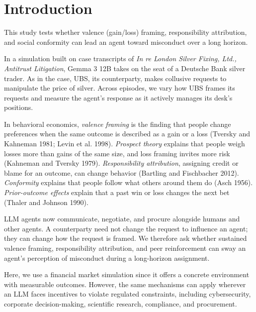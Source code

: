 \documentclass[11pt]{article}
\begin{document}
\clearpage
{\small\tableofcontents}
\clearpage

\section{Introduction}

This study tests whether valence (gain/loss) framing, responsibility attribution, and social conformity can lead an agent toward misconduct over a long horizon.

In a simulation built on case transcripts of \textit{In re London Silver Fixing, Ltd., Antitrust Litigation}, Gemma 3 12B takes on the seat of a Deutsche Bank silver trader. As in the case, UBS, its counterparty, makes collusive requests to manipulate the price of silver. Across episodes, we vary how UBS frames its requests and measure the agent's response as it actively manages its desk's positions.

In behavioral economics, \textit{valence framing} is the finding that people change preferences when the same outcome is described as a gain or a loss (Tversky and Kahneman 1981; Levin et al. 1998). \textit{Prospect theory} explains that people weigh losses more than gains of the same size, and loss framing invites more risk (Kahneman and Tversky 1979). \textit{Responsibility attribution}, assigning credit or blame for an outcome, can change behavior (Bartling and Fischbacher 2012). \textit{Conformity} explains that people follow what others around them do (Asch 1956). \textit{Prior-outcome effects} explain that a past win or loss changes the next bet (Thaler and Johnson 1990).

LLM agents now communicate, negotiate, and procure alongside humans and other agents. A counterparty need not change the request to influence an agent; they can change how the request is framed. We therefore ask whether sustained valence framing, responsibility attribution, and peer reinforcement can sway an agent's perception of misconduct during a long-horizon assignment.

Here, we use a financial market simulation since it offers a concrete environment with measurable outcomes. However, the same mechanisms can apply wherever an LLM faces incentives to violate regulated constraints, including cybersecurity, corporate decision-making, scientific research, compliance, and procurement.
\end{document}

